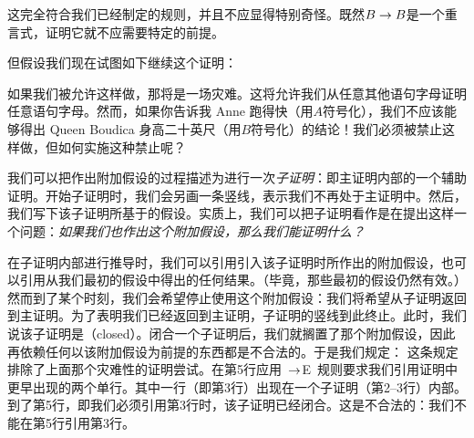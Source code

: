 \begin{fitchproof}
	\PR
	\open
		\AS
		 
	\close
\end{fitchproof}

这完全符合我们已经制定的规则，并且不应显得特别奇怪。既然$B \rightarrow B$是一个重言式，证明它就不应需要特定的前提。

但假设我们现在试图如下继续这个证明：

\begin{fitchproof}
	\PR
	\open
		\AS
		 
	\close
\ifHTMLtarget
	 
\else
	 
	 
\fi
\end{fitchproof}

如果我们被允许这样做，那将是一场灾难。这将允许我们从任意其他语句字母证明任意语句字母。然而，如果你告诉我 Anne 跑得快（用$A$符号化），我们不应该能够得出 Queen Boudica 身高二十英尺（用$B$符号化）的结论！我们必须被禁止这样做，但如何实施这种禁止呢？

我们可以把作出附加假设的过程描述为进行一次\emph{子证明}：即主证明内部的一个辅助证明。开始子证明时，我们会另画一条竖线，表示我们不再处于主证明中。然后，我们写下该子证明所基于的假设。实质上，我们可以把子证明看作是在提出这样一个问题：\emph{如果我们也作出这个附加假设，那么我们能证明什么？}

在子证明内部进行推导时，我们可以引用引入该子证明时所作出的附加假设，也可以引用从我们最初的假设中得出的任何结果。（毕竟，那些最初的假设仍然有效。）然而到了某个时刻，我们会希望停止使用这个附加假设：我们将希望从子证明返回到主证明。为了表明我们已经返回到主证明，子证明的竖线到此终止。此时，我们说该子证明是（closed）。闭合一个子证明后，我们就搁置了那个附加假设，因此再依赖任何以该附加假设为前提的东西都是不合法的。于是我们规定：
这条规定排除了上面那个灾难性的证明尝试。在第5行应用~$\rightarrow$E~规则要求我们引用证明中更早出现的两个单行。其中一行（即第3行）出现在一个子证明（第2–3行）内部。到了第5行，即我们必须引用第3行时，该子证明已经闭合。这是不合法的：我们不能在第5行引用第3行。

